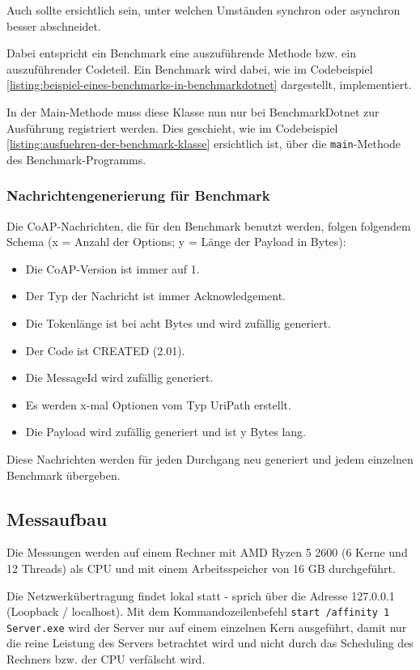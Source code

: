 Auch sollte ersichtlich sein, unter welchen Umständen synchron oder asynchron besser abschneidet.

Dabei entspricht ein Benchmark eine auszuführende Methode bzw. ein auszuführender Codeteil. Ein Benchmark wird dabei, wie im Codebeispiel \ref{listing:beispiel-eines-benchmarks-in-benchmarkdotnet} dargestellt, implementiert.

In der Main-Methode muss diese Klasse nun nur bei BenchmarkDotnet zur Ausführung registriert werden. Dies geschieht, wie im Codebeispiel \ref{listing:ausfuehren-der-benchmark-klasse} ersichtlich ist, über die \texttt{main}-Methode des Benchmark-Programms.

\subsubsection{Nachrichtengenerierung für Benchmark}
\label{subsubsec:nachrichtengenerierung-fuer-benchmark}

Die CoAP-Nachrichten, die für den Benchmark benutzt werden, folgen folgendem Schema (x = Anzahl der Options; y = Länge der Payload in Bytes):
\begin{itemize}
    \item Die CoAP-Version ist immer auf 1.
    \item Der Typ der Nachricht ist immer Acknowledgement.
    \item Die Tokenlänge ist bei acht Bytes und wird zufällig generiert.
    \item Der Code ist CREATED (2.01).
    \item Die MessageId wird zufällig generiert.
    \item Es werden x-mal Optionen vom Typ UriPath erstellt.
    \item Die Payload wird zufällig generiert und ist y Bytes lang.
\end{itemize}

Diese Nachrichten werden für jeden Durchgang neu generiert und jedem einzelnen Benchmark übergeben.

\subsection{Messaufbau}
\label{subsec:messaufbau}

Die Messungen werden auf einem Rechner mit AMD Ryzen 5 2600 (6 Kerne und 12 Threads) als CPU und mit einem Arbeitsspeicher von 16 GB durchgeführt.

Die Netzwerkübertragung findet lokal statt - sprich über die Adresse 127.0.0.1 (Loopback / localhost). Mit dem Kommandozeilenbefehl \texttt{start /affinity 1 Server.exe} wird der Server nur auf einem einzelnen Kern ausgeführt, damit nur die reine Leistung des Servers betrachtet wird und nicht durch das Scheduling des Rechners bzw. der CPU verfälscht wird.

